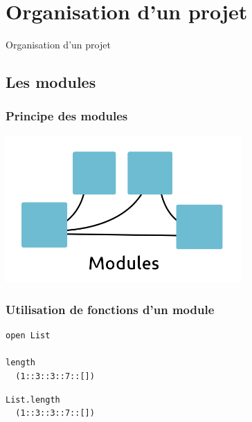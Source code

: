 \section{Organisation d'un projet}

\begin{frame}
	\begin{center}
		\huge
		Organisation d'un projet
	\end{center}
\end{frame}

\subsection{Les modules} %
\begin{frame}
	\frametitle{Principe des modules}
	\begin{center}
		\includegraphics[width=9cm]{pics/modules.png}
	\end{center}
\end{frame}

\begin{frame}[fragile]
	\frametitle{Utilisation de fonctions d'un module}
	\begin{center}
		\begin{minipage}{0.5\textwidth}
			\begin{lstlisting}
open List

length 
  (1::3::3::7::[])
			\end{lstlisting}
		\end{minipage}
		\begin{minipage}{0.4\textwidth}
			\begin{lstlisting}
List.length 
  (1::3::3::7::[])
			\end{lstlisting}
		\end{minipage}
	\end{center}
\end{frame}

